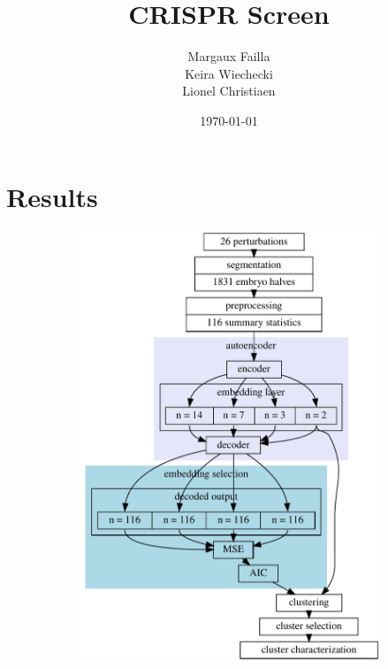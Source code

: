 \documentclass{article}
\title{CRISPR Screen}
\author{Margaux Failla \\
	\And 
	Keira Wiechecki \\
	\And 
	Lionel Christiaen \\
}
\date{\today}
\begin{document}
\section{Results}

\begin{figure}
	\caption{}
	\label{fig:}
\end{figure}

\begin{figure}
     \begin{subfigure}[b]{0.4\textwidth}
         \includegraphics[width=\textwidth]{encode.dot.pdf}
         \caption{}
         \label{fig:}
     \end{subfigure}
     \hfill

\end{figure}
\end{document}
